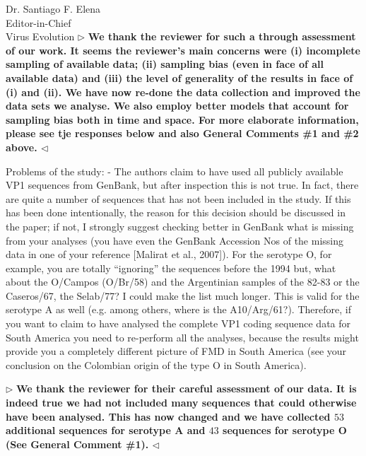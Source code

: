 \documentclass[12pt, a4paper]{letter} %
\newenvironment{reply}{$\triangleright$\bf}{$\triangleleft$}
\begin{document}
\begin{letter}{
	Dr. Santiago F. Elena\\
    Editor-in-Chief \\
    Virus Evolution
}
\begin{reply}
We thank the reviewer for such a through assessment of our work.
It seems the reviewer's main concerns were (i) incomplete sampling of available data; (ii) sampling bias (even in face of all available data) and (iii) the level of generality of the results in face of (i) and (ii).
We have now re-done the data collection and improved the data sets we analyse. %
We also employ better models that account for sampling bias both in time and space.
For more elaborate information, please see tje responses below and also General Comments \#1 and \#2 above.
\end{reply}

Problems of the study:
-       The authors claim to have used all publicly available VP1 sequences from GenBank, but after inspection this is not true. 
In fact, there are quite a number of sequences that has not been included in the study. If this has been done intentionally, the reason for this decision should be discussed in the paper; if not, I strongly suggest checking better in GenBank what is missing from your analyses (you have even the GenBank Accession Nos of the missing data in one of your reference [Malirat et al., 2007]). 
For the serotype O, for example, you are totally ``ignoring'' the sequences before the 1994 but, what about the O/Campos (O/Br/58) and the Argentinian samples of the 82-83 or the Caseros/67, the Selab/77? I could make the list much longer. 
This is valid for the serotype A as well (e.g. among others, where is the A10/Arg/61?). 
Therefore, if you want to claim to have analysed the complete VP1 coding sequence data for South America you need to re-perform all the analyses, because the results might provide you a completely different picture of FMD in South America (see your conclusion on the Colombian origin of the type O in South America).

\begin{reply}
We thank the reviewer for their careful assessment of our data.
It is indeed true we had not included many sequences that could otherwise have been analysed.
This has now changed and we have collected $53$ additional sequences for serotype A and $43$ sequences for serotype O (See General Comment \#1).
\end{reply}


\end{letter}
\end{document}

